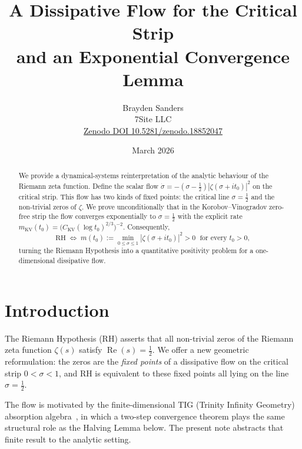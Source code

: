 \documentclass[11pt]{article}
\title{A Dissipative Flow for the Critical Strip\\
       and an Exponential Convergence Lemma}
\author{Brayden Sanders\\7Site LLC\\
\small\href{https://doi.org/10.5281/zenodo.18852047}%
{Zenodo DOI 10.5281/zenodo.18852047}}
\date{March 2026}
\begin{document}
\maketitle


\begin{abstract}
We provide a dynamical-systems reinterpretation of the analytic behaviour
of the Riemann zeta function.
Define the scalar flow $\dot\sigma=-(\sigma-\tfrac12)|\zeta(\sigma+it_0)|^2$
on the critical strip.
This flow has two kinds of fixed points: the critical line $\sigma=\tfrac12$
and the non-trivial zeros of $\zeta$.
We prove unconditionally that in the Korobov--Vinogradov zero-free strip the
flow converges exponentially to $\sigma=\tfrac12$ with the explicit rate
$m_{\mathrm{KV}}(t_0)=\bigl(C_{\mathrm{KV}}(\log t_0)^{2/3}\bigr)^{-2}$.
Consequently,
\[
  \text{RH}\;\Longleftrightarrow\;
  m(t_0):=\min_{0\le\sigma\le1}|\zeta(\sigma+it_0)|^2>0
  \;\text{ for every }t_0>0,
\]
turning the Riemann Hypothesis into a quantitative positivity problem
for a one-dimensional dissipative flow.
\end{abstract}

\section{Introduction}

The Riemann Hypothesis (RH) asserts that all non-trivial zeros of the
Riemann zeta function $\zeta(s)$ satisfy $\operatorname{Re}(s)=\tfrac12$.
We offer a new geometric reformulation: the zeros are the \emph{fixed
points} of a dissipative flow on the critical strip $0<\sigma<1$, and
RH is equivalent to these fixed points all lying on the line
$\sigma=\tfrac12$.

The flow is motivated by the finite-dimensional TIG (Trinity Infinity
Geometry) absorption algebra~\cite{tig}, in which a two-step convergence
theorem plays the same structural role as the Halving Lemma below.
The present note abstracts that finite result to the analytic setting.
\end{document}
